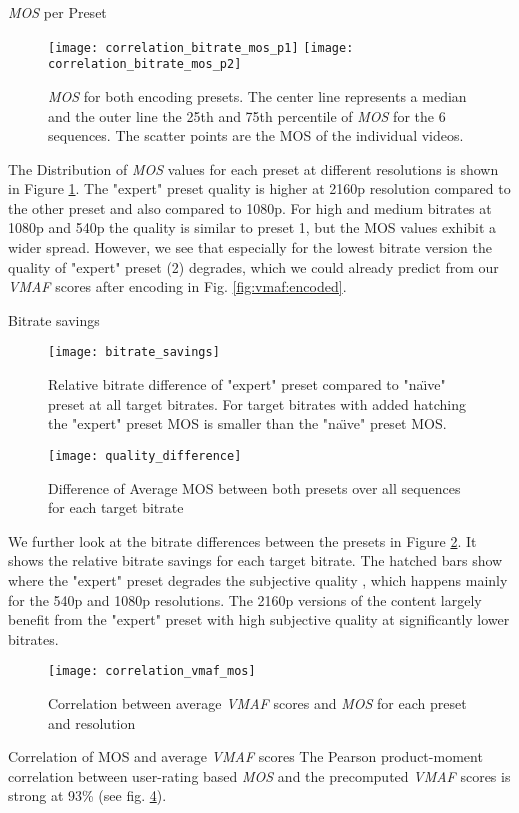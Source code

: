 \large{\textit{MOS} per Preset}
\begin{figure}
	\centering
	\texttt{[image: correlation\_bitrate\_mos\_p1]}
	\texttt{[image: correlation\_bitrate\_mos\_p2]}
	\caption{\textit{MOS} for both encoding presets. The center line represents a median and the outer line the 25th and 75th percentile of \textit{MOS} for the 6 sequences. The scatter points are the MOS of the individual videos.}
	\label{fig:result:correlation_bitrate_mos}
\end{figure}

The Distribution of \textit{MOS} values for each preset at different resolutions is shown in Figure \ref{fig:result:correlation_bitrate_mos}.
The "expert" preset quality is higher at 2160p resolution compared to the other preset and also compared to 1080p. For high and medium bitrates at 1080p and 540p the quality is similar to preset 1, but the MOS values exhibit a wider spread.
However, we see that especially for the lowest bitrate version the quality of "expert" preset (2) degrades, which we could already predict from our \textit{VMAF} scores after encoding in Fig. \ref{fig:vmaf:encoded}.

\large{Bitrate savings}
\begin{figure}
	\centering
	\texttt{[image: bitrate\_savings]}
	\caption{Relative bitrate difference of "expert" preset compared to "na\"{\i}ve" preset at all target bitrates. For target bitrates with added hatching the "expert" preset MOS is smaller than the "na\"{\i}ve" preset MOS.}
	\label{fig:result:bitrate_savings}
\end{figure}
\begin{figure}
	\centering
	\texttt{[image: quality\_difference]}
	\caption{Difference of Average MOS between both presets over all sequences for each target bitrate}
	\label{fig:result:quality_difference}
\end{figure}

We further look at the bitrate differences between the presets in Figure \ref{fig:result:bitrate_savings}. It shows the relative bitrate savings for each target bitrate. The hatched bars show where the "expert" preset degrades the subjective quality , which happens mainly for the 540p and 1080p resolutions. The 2160p versions of the content largely benefit from the "expert" preset with high subjective quality at significantly lower bitrates.


\begin{figure}
	\centering
	\texttt{[image: correlation\_vmaf\_mos]}
	\caption{Correlation between average \textit{VMAF} scores and \textit{MOS} for each preset and resolution}
	\label{fig:result:correlation_vmaf_mos}
\end{figure}


\large{Correlation of MOS and average \textit{VMAF} scores}
The Pearson product-moment correlation between user-rating based \textit{MOS} and the precomputed \textit{VMAF} scores is strong at 93\% (see fig. \ref{fig:result:correlation_vmaf_mos}).
\\
